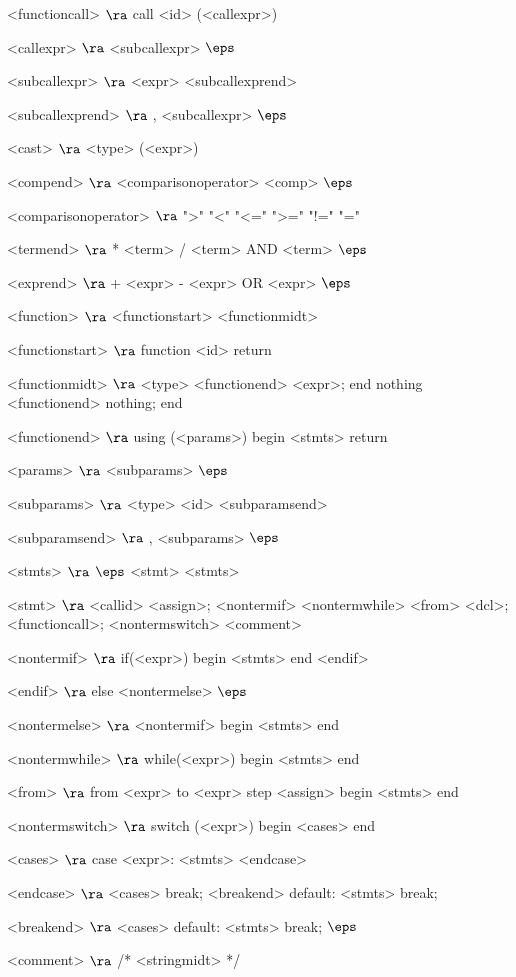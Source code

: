 \begin{grammar}
<functioncall> $\ra$ call <id> (<callexpr>)

<callexpr> $\ra$ <subcallexpr>
\alt$\eps$

<subcallexpr> $\ra$ <expr> <subcallexprend>

<subcallexprend> $\ra$ , <subcallexpr>
\alt$\eps$

<cast> $\ra$ <type> (<expr>)

<compend> $\ra$ <comparisonoperator> <comp>
\alt$\eps$

<comparisonoperator> $\ra$ ">"
				\alt "<"
				\alt "<="
				\alt ">="
				\alt "!="
				\alt "="

<termend> $\ra$ * <term>
\alt / <term>
\alt AND <term>
\alt$\eps$

<exprend> $\ra$ + <expr>
\alt - <expr>
\alt OR <expr>
\alt$\eps$

<function> $\ra$  <functionstart> <functionmidt>

<functionstart> $\ra$ function <id> return

<functionmidt> $\ra$ <type> <functionend> <expr>; end
\alt nothing <functionend> nothing; end

<functionend> $\ra$
using (<params>)
begin
	<stmts>
	return

<params> $\ra$ <subparams>
	\alt$\eps$

<subparams> $\ra$ <type> <id> <subparamsend>

<subparamsend> $\ra$ , <subparams>
\alt$\eps$

<stmts> $\ra$ $\eps$
	\alt <stmt> <stmts>

<stmt> $\ra$ <callid> <assign>;
	\alt <nontermif>
	\alt <nontermwhile>
	\alt <from>
	\alt <dcl>;
	\alt <functioncall>;
	\alt <nontermswitch>
	\alt <comment>
	
<nontermif> $\ra$ if(<expr>)
	begin
		<stmts>
	end
	<endif>

<endif> $\ra$ 
	else <nontermelse>
	\alt$\eps$

<nontermelse> $\ra$ <nontermif>
	\alt begin
		<stmts>
	end

<nontermwhile> $\ra$ while(<expr>)
		begin
			<stmts>
		end
		
<from> $\ra$ from <expr> to <expr> step <assign>
	begin
		<stmts>
	end

<nontermswitch> $\ra$ switch (<expr>)
		begin
			<cases>
		end

<cases> $\ra$ case <expr>:
			<stmts>
		<endcase>
		
<endcase> $\ra$ <cases>
		\alt break; <breakend>
		\alt default:
			<stmts>
			break;

<breakend> $\ra$ <cases>
\alt default:
<stmts>
break;
\alt$\eps$

<comment> $\ra$ /* <stringmidt> */


\end{grammar}